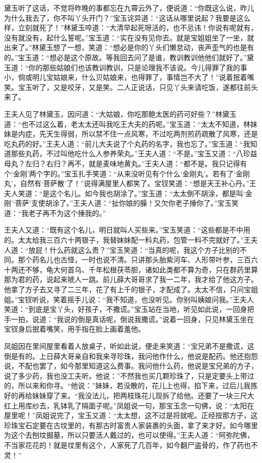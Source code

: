 \documentclass[12pt,oneside]{book}
\begin{document}
黛玉听了这话，不觉将昨晚的事都忘在九霄云外了，便说道：“你既这么说，昨儿为什么我去了，你不叫丫头开门？”宝玉诧异道：“这话从哪里说起？我要是这么样，立刻就死了！”林黛玉啐道：“大清早起死呀活的，也不忌讳！你说有呢就有，没有就没有，起什么誓呢。”宝玉道：“实在没有见你去。就是宝姐姐坐了一坐，就出来了。”林黛玉想了一想，笑道：“想必是你的丫头们懒怠动，丧声歪气的也是有的。”宝玉道：“想必是这个原故。等我回去问了是谁，教训教训他他们就好了。”黛玉道：“你的那些姑娘们也该教训教训，只是论理我不该说。今儿得罪了我的事小，倘或明儿宝姑娘来，什么贝姑娘来，也得罪了，事情岂不大了！”说着抿着嘴笑。宝玉听了，又是咬牙，又是笑。二人正说话，只见丫头来请吃饭，遂都往前头来了。

王夫人见了林黛玉，因问道：“大姑娘，你吃那鲍太医的药可好些？”林黛玉道：“也不过这么着，老太太还叫我吃王大夫的药呢。”宝玉道：“太太不知道，林妹妹是内症，先天生得弱，所以禁不住一点风寒，不过吃两剂煎药疏散了风寒，还是吃丸药的好。”王夫人道：“前儿大夫说了个丸药的名字，我也忘了。”宝玉道：“我知道那些丸药，不过叫他吃什么人参养荣丸。”王夫人道：“不是。”宝玉又道：“八珍益母丸？左归？右归？再不，就是麦味地黄丸。”王夫人道：“都不是。我只记得有个‘金刚’两个字的。”宝玉扎手笑道：“从来没听见有个什么‘金刚丸’。若有了‘金刚丸’，自然有‘菩萨散’了！”说得满屋里人都笑了。宝钗笑道：“想是天王补心丹。”王夫人笑道：“是这个名儿。如今我也胡涂了。”宝玉道：“太太倒不胡涂，都是叫‘金刚’‘菩萨’支使胡涂了。”王夫人道：“扯你娘的臊！又欠你老子捶你了。”宝玉笑道：“我老子再不为这个捶我的。”

王夫人又道：“既有这个名儿，明日就叫人买些来。”宝玉笑道：“这些都是不中用的。太太给我三百六十两银子，我替妹妹配一料丸药，包管一料不完就好了。”王夫人道：“放屁！什么药就这么贵？”宝玉笑道：“当真的呢，我这个方子比别的不同。那个药名儿也古怪，一时也说不清。只讲那头胎紫河车、人形带叶参，三百六十两还不够，龟大何首乌、千年松根茯苓胆，诸如此类都不算为奇，只在群药里算那为君的药，说起来唬人一跳。前儿薛大哥哥求了我一二年，我才给了他这方子。他拿了方子去又寻了二三年，花了有上千的银子，才配成了。太太不信，只问宝姐姐。”宝钗听说，笑着摇手儿说：“我不知道，也没听见。你别叫姨娘问我。”王夫人笑道：“到底是宝丫头，好孩子，不撒谎。”宝玉站在当地，听见如此说，一回身把手一拍，说道：“我说的倒是真话呢，倒说我撒谎。”说着一回身，只见林黛玉坐在宝钗身后抿着嘴笑，用手指在脸上画着羞他。

凤姐因在里间屋里看着人放桌子，听如此说，便走来笑道：“宝兄弟不是撒谎，这倒是有的。上日薛大哥亲自和我来寻珍珠，我问他作什么，他说是配药。他还抱怨说，不配也罢了，如今那里知道这么费事。我问他什么药，他说是宝兄弟的方子，说了多少药，我也没工夫听。他说：”不然我也买几颗珍珠了，只是定要头上带过的，所以来和你寻。“他说：”妹妹，若没散的，花儿上也得，掐下来，过后儿我拣好的再给妹妹穿了来。“我没法儿，把两枝珠花儿现拆了给他。还要了一块三尺大红上用库纱去，乳钵乳了隔面子呢。”凤姐说一句，那宝玉念一句佛，说：“太阳在屋里呢！”凤姐说完了，宝玉又道：“太太想，这不过是将就呢。正经按那方子，这珍珠宝石定要在古坟里的，有那古时富贵人家装裹的头面，拿了来才好。如今哪里为这个去刨坟掘墓，所以只要活人戴过的，也可以使得。”王夫人道：“阿弥陀佛，不当家花花的！就是坟里有这个，人家死了几百年，如今翻尸盗骨的，作了药也不灵！”
\end{document}

